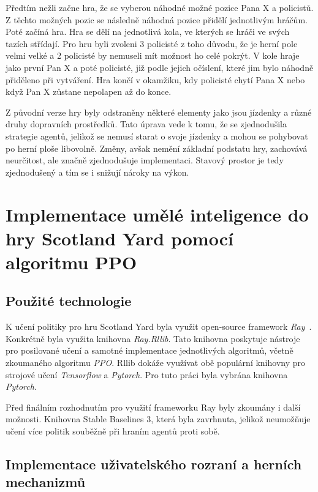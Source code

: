 Předtím nežli začne hra, že se vyberou náhodné možné pozice Pana X a policistů.
Z těchto možných pozic se následně náhodná pozice přidělí jednotlivým hráčům.
Poté začíná hra.
Hra se dělí na jednotlivá kola, ve kterých se hráči ve svých tazích střídají.
Pro hru byli zvoleni 3 policisté z toho důvodu, že je herní pole velmi velké a 2 policisté by nemuseli mít možnost ho celé pokrýt.
V kole hraje jako první Pan X a poté policisté, již podle jejich očíslení, které jim bylo náhodně přiděleno při vytváření.
Hra končí v okamžiku, kdy policisté chytí Pana X nebo když Pan X zůstane nepolapen až do konce.

Z původní verze hry byly odstraněny některé elementy jako jsou jízdenky a různé druhy dopravních prostředků.
Tato úprava vede k tomu, že se zjednodušila strategie agentů, jelikož se nemusí starat o svoje jízdenky a mohou se pohybovat po herní ploše libovolně.
Změny, avšak nemění základní podstatu hry, zachovává neurčitost, ale značně zjednodušuje implementaci.
Stavový prostor je tedy zjednodušený a tím se i snižují nároky na výkon.

\section{Implementace umělé inteligence do hry Scotland Yard pomocí algoritmu PPO}
\label{sec:implementace}

\subsection{Použité technologie}\label{subsec:pouzite-technologie}
K učení politiky pro hru Scotland Yard byla využit open-source framework \emph{Ray}~\cite{Ray}.
Konkrétně byla využita knihovna \emph{Ray.Rllib}.
Tato knihovna poskytuje nástroje pro posilované učení a samotné implementace jednotlivých algoritmů, včetně zkoumaného algoritmu \emph{PPO}.
Rllib dokáže využívat obě populární knihovny pro strojové učení \emph{Tensorflow} a \emph{Pytorch}.
Pro tuto práci byla vybrána knihovna \emph{Pytorch}.

Před finálním rozhodnutím pro využití frameworku Ray byly zkoumány i další možnosti.
Knihovna Stable Baselines 3, která byla zavrhnuta, jelikož neumožňuje učení více politik souběžně při hraním agentů proti sobě.

\subsection{Implementace uživatelského rozraní a herních mechanizmů}\label{subsec:implementace-uzivatelskeho-rozrani-a-hernich-mechanizmu}

